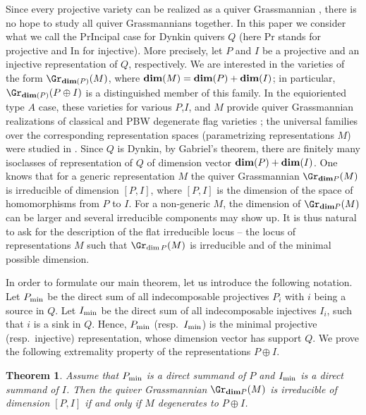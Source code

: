 \documentclass{amsart}
\newcommand{\bdim}{{\rm\bf dim}}
\newtheorem{theoremA}{Theorem}
\numberwithin{equation}{section}
\theoremstyle{remark}
\begin{document}
Since every projective variety can be realized as a quiver Grassmannian \cite{Re13,Ri18},
there is no hope to study all quiver Grassmannians together. In this paper we consider what we call the
 PrIncipal case for Dynkin quivers $Q$ (here Pr stands for projective and In 
for injective). More precisely, let $P$ and $I$ be a projective and an injective representation
of $Q$, respectively. We are interested in the varieties of the form $\Gr_{\bdim(P)}(M)$, where 
$\bdim(M) = \bdim(P) + \bdim(I)$; in particular, $\Gr_{\bdim(P)}(P\oplus I)$ is a distinguished 
member of this family. In the equioriented type $A$ case, these varieties for various 
$P$,$I$, and $M$ provide quiver Grassmannian realizations of classical and PBW degenerate 
flag varieties \cite{CFR12,Fe12}; the universal families over the corresponding 
representation spaces (parametrizing representations $M$) were studied in 
\cite{CFFFR17,CFFFR20}.  Since $Q$ is Dynkin, by Gabriel's theorem, there are finitely many isoclasses of representation of $Q$
of dimension vector $\bdim(P) + \bdim(I)$.  One knows \cite{CFR12} that 
for a generic representation
$M$ the quiver Grassmannian $\Gr_{{\rm\bf dim} P}(M)$ is irreducible of dimension 
$[P,I]$, where $[P,I]$ is the dimension of the space of homomorphisms from $P$ to $I$.
For a non-generic $M$, the dimension of $\Gr_{{\rm\bf dim} P}(M)$ can be larger and several irreducible
components may show up. It is thus natural to ask for the description of the flat 
irreducible locus -- the locus of representations $M$ such that $\Gr_{\dim P}(M)$ 
is irreducible and of the minimal possible dimension. 

In order to formulate our  main theorem, let us
introduce the following notation. Let $P_{\rm min}$ be the direct sum of all indecomposable
projectives $P_i$ with $i$ being a source in $Q$. Let $I_{\rm min}$ be the direct sum of 
all indecomposable injectives $I_i$, such that $i$ is a sink in $Q$. Hence,
$P_{\rm min}$ (resp.~$I_{\rm min}$) is the minimal projective (resp.~injective) representation,
whose dimension vector has support $Q$. We prove the following extremality property
of the representations $P\oplus I$.

\begin{theoremA}
Assume that $P_{\rm min}$ is a direct summand of $P$ and $I_{\rm min}$ is a direct summand of $I$. 
Then  the quiver Grassmannian $\Gr_{{\rm\bf dim} P}(M)$ is irreducible of dimension 
$[P,I]$
if and only if $M$ degenerates to $P\oplus I$.
\end{theoremA}
\end{document}
